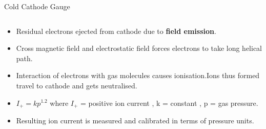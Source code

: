 \documentclass[11pt]{beamer}
\begin{document}
\begin{frame}{Cold Cathode Gauge}
\begin{columns}[]
       \begin{exampleblock}{ }
          
        \begin{itemize}
          \item Residual electrons ejected from cathode due to \textbf{field emission}. 
          \item Cross magnetic field and electrostatic field forces electrons to take long helical path.
          \item Interaction of electrons with gas molecules causes ionisation.Ions thus formed travel to cathode and gets neutralised.
          \item $I_{+ }= k p^{1.2}$  where $I_{+ }$ = positive ion current , k = constant , p = gas pressure.
          \item Resulting ion current is measured and calibrated in terms of pressure units.
        \end{itemize}
       
       \end{exampleblock}   
   
    \end{columns}   
  
  
  
  
        


\end{frame}
\end{document}
